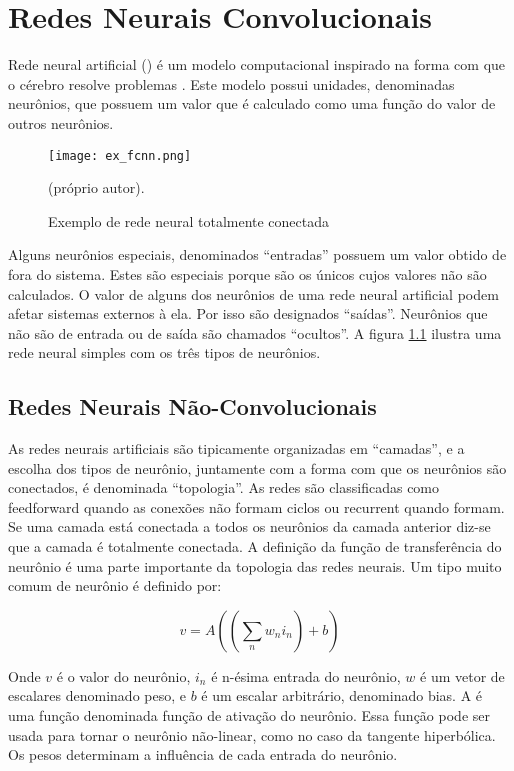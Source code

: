 
\chapter{Redes Neurais Convolucionais}
\setcounter{figure}{100}

Rede neural artificial () é um modelo computacional inspirado na forma com
que o cérebro resolve problemas \cite{gilbert2000build}. Este modelo possui
unidades, denominadas neurônios, que possuem um valor que é calculado como uma
função do valor de outros neurônios.

\begin{figure}[!htb]
	\centering
	\texttt{[image: ex\_fcnn.png]}
	\caption{Exemplo de rede neural totalmente conectada}
	\label{fig:ex_fcnn}
	(próprio autor).
\end{figure}

Alguns neurônios especiais, denominados “entradas” possuem um valor obtido de
fora do sistema. Estes são especiais porque são os únicos cujos valores não são
calculados. O valor de alguns dos neurônios de uma rede neural artificial podem
afetar sistemas externos à ela. Por isso são designados “saídas”. Neurônios que
não são de entrada ou de saída são chamados “ocultos”. A figura
\ref{fig:ex_fcnn} ilustra uma rede neural simples com os três tipos de
neurônios.

\section{Redes Neurais Não-Convolucionais}
As redes neurais artificiais são tipicamente organizadas em “camadas”, e a
escolha dos tipos de neurônio, juntamente com a forma com que os neurônios são
conectados, é denominada “topologia”. As redes são classificadas como
feedforward quando as conexões não formam ciclos ou recurrent quando formam. Se
uma camada está conectada a todos os neurônios da camada anterior diz-se que a
camada é totalmente conectada.
A definição da função de transferência do neurônio é uma parte importante da
topologia das redes neurais. Um tipo muito comum de neurônio é definido por:

\begin{equation} \label{eq:non-conv-layer}
	v=A \left( \left( \sum_n w_n i_n \right) + b \right)
\end{equation}

Onde $v$ é o valor do neurônio, $i_n$ é n-ésima entrada do neurônio,
$w$ é um vetor de escalares denominado peso, e $b$ é um escalar arbitrário,
denominado bias. A é uma
função denominada função de ativação do neurônio. Essa função pode ser usada
para tornar o neurônio não-linear, como no caso da tangente hiperbólica. Os
pesos determinam a influência de cada entrada do neurônio.

